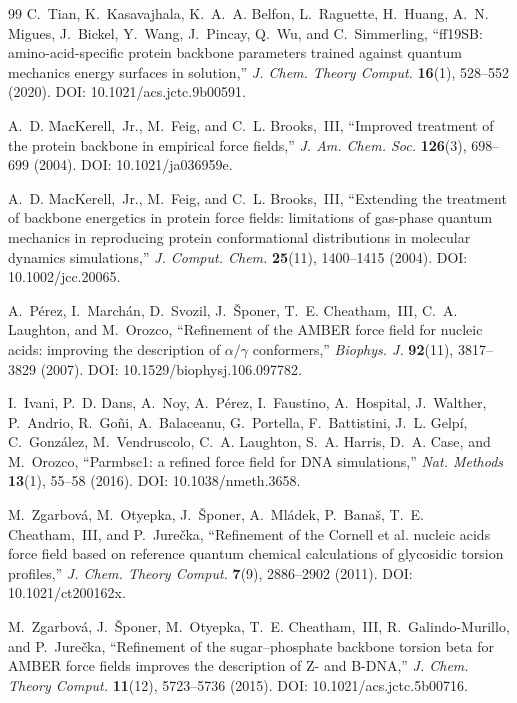 \begin{thebibliography}{99}
C.~Tian, K.~Kasavajhala, K.~A.~A. Belfon, L.~Raguette, H.~Huang, A.~N. Migues,
J.~Bickel, Y.~Wang, J.~Pincay, Q.~Wu, and C.~Simmerling,
``ff19SB: amino-acid-specific protein backbone parameters trained against
quantum mechanics energy surfaces in solution,''
\emph{J. Chem. Theory Comput.} \textbf{16}(1), 528--552 (2020).
DOI: 10.1021/acs.jctc.9b00591.

A.~D. MacKerell,~Jr., M.~Feig, and C.~L. Brooks,~III,
``Improved treatment of the protein backbone in empirical force fields,''
\emph{J. Am. Chem. Soc.} \textbf{126}(3), 698--699 (2004).
DOI: 10.1021/ja036959e.

A.~D. MacKerell,~Jr., M.~Feig, and C.~L. Brooks,~III,
``Extending the treatment of backbone energetics in protein force fields:
limitations of gas-phase quantum mechanics in reproducing protein
conformational distributions in molecular dynamics simulations,''
\emph{J. Comput. Chem.} \textbf{25}(11), 1400--1415 (2004).
DOI: 10.1002/jcc.20065.

A.~P\'erez, I.~March\'an, D.~Svozil, J.~\v{S}poner, T.~E. Cheatham,~III,
C.~A. Laughton, and M.~Orozco,
``Refinement of the AMBER force field for nucleic acids: improving the
description of $\alpha/\gamma$ conformers,''
\emph{Biophys. J.} \textbf{92}(11), 3817--3829 (2007).
DOI: 10.1529/biophysj.106.097782.

I.~Ivani, P.~D. Dans, A.~Noy, A.~P\'erez, I.~Faustino, A.~Hospital, J.~Walther,
P.~Andrio, R.~Go\~ni, A.~Balaceanu, G.~Portella, F.~Battistini, J.~L. Gelp\'i,
C.~Gonz\'alez, M.~Vendruscolo, C.~A. Laughton, S.~A. Harris, D.~A. Case, and
M.~Orozco,
``Parmbsc1: a refined force field for DNA simulations,''
\emph{Nat. Methods} \textbf{13}(1), 55--58 (2016).
DOI: 10.1038/nmeth.3658.

M.~Zgarbov\'a, M.~Otyepka, J.~\v{S}poner, A.~Ml\'adek, P.~Bana\v{s},
T.~E. Cheatham,~III, and P.~Jure\v{c}ka,
``Refinement of the Cornell et al. nucleic acids force field based on reference
quantum chemical calculations of glycosidic torsion profiles,''
\emph{J. Chem. Theory Comput.} \textbf{7}(9), 2886--2902 (2011).
DOI: 10.1021/ct200162x.

M.~Zgarbov\'a, J.~\v{S}poner, M.~Otyepka, T.~E. Cheatham,~III,
R.~Galindo-Murillo, and P.~Jure\v{c}ka,
``Refinement of the sugar--phosphate backbone torsion beta for AMBER force
fields improves the description of Z- and B-DNA,''
\emph{J. Chem. Theory Comput.} \textbf{11}(12), 5723--5736 (2015).
DOI: 10.1021/acs.jctc.5b00716.


\end{thebibliography}
